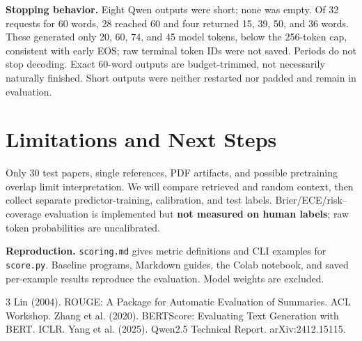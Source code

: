 \documentclass[11pt]{article}
\begin{document}
\textbf{Stopping behavior.} Eight Qwen outputs were short; none was empty. Of 32 requests for 60 words, 28 reached 60 and four returned 15, 39, 50, and 36 words. These generated only 20, 60, 74, and 45 model tokens, below the 256-token cap, consistent with early EOS; raw terminal token IDs were not saved. Periods do not stop decoding. Exact 60-word outputs are budget-trimmed, not necessarily naturally finished. Short outputs were neither restarted nor padded and remain in evaluation.

\section*{Limitations and Next Steps}
Only 30 test papers, single references, PDF artifacts, and possible pretraining overlap limit interpretation. We will compare retrieved and random context, then collect separate predictor-training, calibration, and test labels. Brier/ECE/risk--coverage evaluation is implemented but \textbf{not measured on human labels}; raw token probabilities are uncalibrated.

\textbf{Reproduction.} \texttt{scoring.md} gives metric definitions and CLI examples for \texttt{score.py}. Baseline programs, Markdown guides, the Colab notebook, and saved per-example results reproduce the evaluation. Model weights are excluded.

\begingroup
\small
\setlength{\parskip}{0pt}
\begin{thebibliography}{3}
\setlength{\itemsep}{0pt}
 Lin (2004). ROUGE: A Package for Automatic Evaluation of Summaries. ACL Workshop.
 Zhang et al. (2020). BERTScore: Evaluating Text Generation with BERT. ICLR.
 Yang et al. (2025). Qwen2.5 Technical Report. arXiv:2412.15115.
\end{thebibliography}
\endgroup
\end{document}
